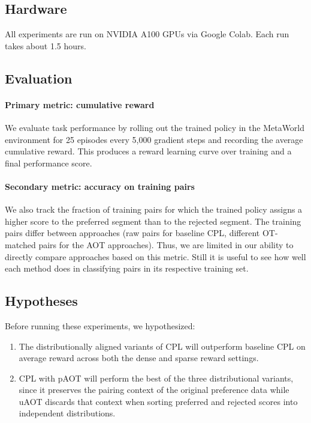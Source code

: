 \documentclass[11pt]{article}
\begin{document}
\subsection{Hardware}

All experiments are run on NVIDIA A100 GPUs via Google Colab. Each run takes about 1.5 hours.

\subsection{Evaluation}

\paragraph{Primary metric: cumulative reward} We evaluate task performance by rolling out the trained policy in the MetaWorld environment for 25 episodes every 5,000 gradient steps and recording the average cumulative reward. This produces a reward learning curve over training and a final performance score.

\paragraph{Secondary metric: accuracy on training pairs} We also track the fraction of training pairs for which the trained policy assigns a higher score to the preferred segment than to the rejected segment. The training pairs differ between approaches (raw pairs for baseline CPL, different OT-matched pairs for the AOT approaches). Thus, we are limited in our ability to directly compare approaches based on this metric. Still it is useful to see how well each method does in classifying pairs in its respective training set.

\subsection{Hypotheses}

Before running these experiments, we hypothesized:

\begin{enumerate}
    \item The distributionally aligned variants of CPL will outperform baseline CPL on average reward across both the dense and sparse reward settings.
    \item CPL with pAOT will perform the best of the three distributional variants, since it preserves the pairing context of the original preference data while uAOT discards that context when sorting preferred and rejected scores into independent distributions.
\end{enumerate}
\end{document}

